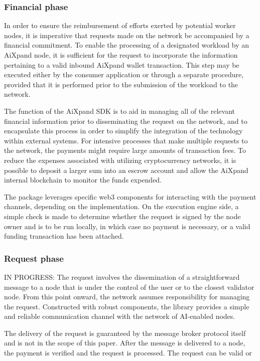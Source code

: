 \documentclass{article}
\begin{document}
\subsubsection{Financial phase}
In order to ensure the reimbursement of efforts exerted by potential worker nodes, it is imperative that requests made on the network be accompanied by a financial commitment. To enable the processing of a designated workload by an AiXpand node, it is sufficient for the request to incorporate the information pertaining to a valid inbound AiXpand wallet transaction. This step may be executed either by the consumer application or through a separate procedure, provided that it is performed prior to the submission of the workload to the network.

The function of the AiXpand SDK  is to aid in managing all of the relevant financial information prior to disseminating the request on the network, and to encapsulate this process in order to simplify the integration of the technology within external systems. For intensive processes that make multiple requests to the network, the payments might require large amounts of transaction fees. To reduce the expenses associated with utilizing cryptocurrency networks, it is possible to deposit a larger sum into an escrow account and allow the AiXpand internal blockchain to monitor the funds expended.

The package leverages specific web3 components for interacting with the payment channels, depending on the implementation. On the execution engine side, a simple check is made to determine whether the request is signed by the node owner and is to be run locally, in which case no payment is necessary, or a valid funding transaction has been attached.

\subsubsection{Request phase} IN PROGRESS:
The request involves the dissemination of a straightforward message to a node that is under the control of the user or to the closest validator node. From this point onward, the network assumes responsibility for managing the request. Constructed with robust components, the library provides a simple and reliable communication channel with the network of AI-enabled nodes. 

The delivery of the request is guaranteed by the message broker protocol itself and is not in the scope of this paper. After the message is delivered to a node, the payment is verified and the request is processed. The request can be valid or 
\end{document}
